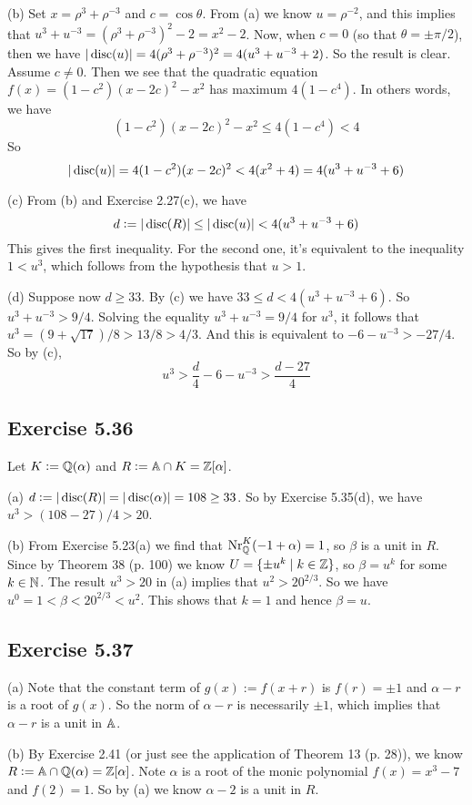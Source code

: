 \documentclass[../Marcus.tex]{subfiles}
\begin{document}
(b) Set $x=\rho^3+\rho^{-3}$ and $c=\cos\theta$. From (a) we know $u=\rho^{-2}$, and this implies that $u^3+u^{-3} = (\rho^3+\rho^{-3})^2-2 = x^2-2$. Now, when $c=0$ (so that $\theta=\pm\pi/2$), then we have $|\disc(u)| = 4(\rho^3+\rho^{-3})^2 = 4(u^3+u^{-3}+2)$. So the result is clear. Assume $c\neq0$. Then we see that the quadratic equation $f(x)=(1-c^2)(x-2c)^2-x^2$ has maximum $4(1-c^4)$. In others words, we have
$$
(1-c^2)(x-2c)^2-x^2 \leq 4(1-c^4) < 4
$$
So
$$
|\disc(u)| = 4(1-c^2)(x-2c)^2 < 4(x^2+4) = 4(u^3+u^{-3} +6) 
$$

(c) From (b) and Exercise 2.27(c), we have
$$
d := |\disc(R)| \leq |\disc(u)| < 4(u^3+u^{-3}+6)
$$
This gives the first inequality. For the second one, it's equivalent to the inequality $1<u^3$, which follows from the hypothesis that $u>1$.

(d) Suppose now $d\geq33$. By (c) we have $33 \leq d < 4(u^3+u^{-3}+6)$. So $u^3+u^{-3} > 9/4$. Solving the equality $u^3+u^{-3} = 9/4$ for $u^3$, it follows that $u^3 = (9+\sqrt{17})/8 > 13/8 > 4/3$. And this is equivalent to $-6-u^{-3} > -27/4$. So by (c),
$$
u^3 > \frac{d}{4} -6 - u^{-3} > \frac{d-27}{4}
$$

\subsection*{Exercise 5.36}

Let $K:=\QQ(\alpha)$ and $R:=\AA \cap K = \ZZ[\alpha]$.

(a) $d := |\disc(R)| = |\disc(\alpha)| = 108 \geq 33$. So by Exercise 5.35(d), we have $u^3 > (108-27)/4 > 20$.

(b) From Exercise 5.23(a) we find that $\NrKQ(-1+\alpha) = 1$, so $\beta$ is a unit in $R$. Since by Theorem 38 (p. 100) we know $U = \{\pm u^k \mid k \in\ZZ\}$, so $\beta = u^k$ for some $k\in\NN$. The result $u^3 > 20$ in (a) implies that $u^2 > 20^{2/3}$. So we have $u^0 = 1 < \beta < 20^{2/3} < u^2$. This shows that $k=1$ and hence $\beta=u$.

\subsection*{Exercise 5.37}

(a) Note that the constant term of $g(x) := f(x+r)$ is $f(r) = \pm 1$ and $\alpha-r$ is a root of $g(x)$. So the norm of $\alpha-r$ is necessarily $\pm1$, which implies that $\alpha-r$ is a unit in $\AA$.

(b) By Exercise 2.41 (or just see the application of Theorem 13 (p. 28)), we know $R:= \AA\cap\QQ(\alpha) = \ZZ[\alpha]$. Note $\alpha$ is a root of the monic polynomial $f(x)=x^3-7$ and $f(2)=1$. So by (a) we know $\alpha-2$ is a unit in $R$.
\end{document}
